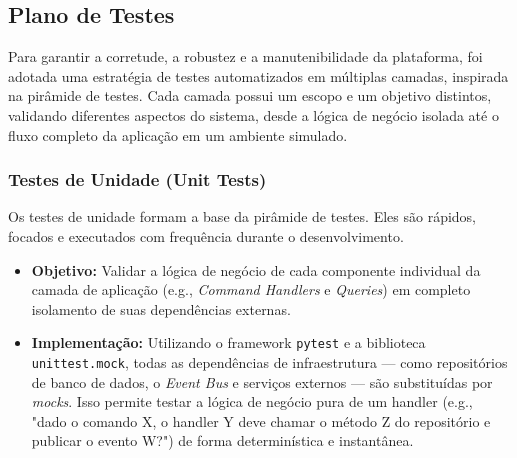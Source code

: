 \subsection{Plano de Testes}
\label{sec:plano_de_testes}

Para garantir a corretude, a robustez e a manutenibilidade da plataforma, foi adotada uma estratégia de testes automatizados em múltiplas camadas, inspirada na pirâmide de testes. Cada camada possui um escopo e um objetivo distintos, validando diferentes aspectos do sistema, desde a lógica de negócio isolada até o fluxo completo da aplicação em um ambiente simulado.

\subsubsection{Testes de Unidade (Unit Tests)}
Os testes de unidade formam a base da pirâmide de testes. Eles são rápidos, focados e executados com frequência durante o desenvolvimento.
\begin{itemize}
    \item \textbf{Objetivo:} Validar a lógica de negócio de cada componente individual da camada de aplicação (e.g., \textit{Command Handlers} e \textit{Queries}) em completo isolamento de suas dependências externas.
    \item \textbf{Implementação:} Utilizando o framework \texttt{pytest} e a biblioteca \texttt{unittest.mock}, todas as dependências de infraestrutura — como repositórios de banco de dados, o \textit{Event Bus} e serviços externos — são substituídas por \textit{mocks}. Isso permite testar a lógica de negócio pura de um handler (e.g., "dado o comando X, o handler Y deve chamar o método Z do repositório e publicar o evento W?") de forma determinística e instantânea.
\end{itemize}


